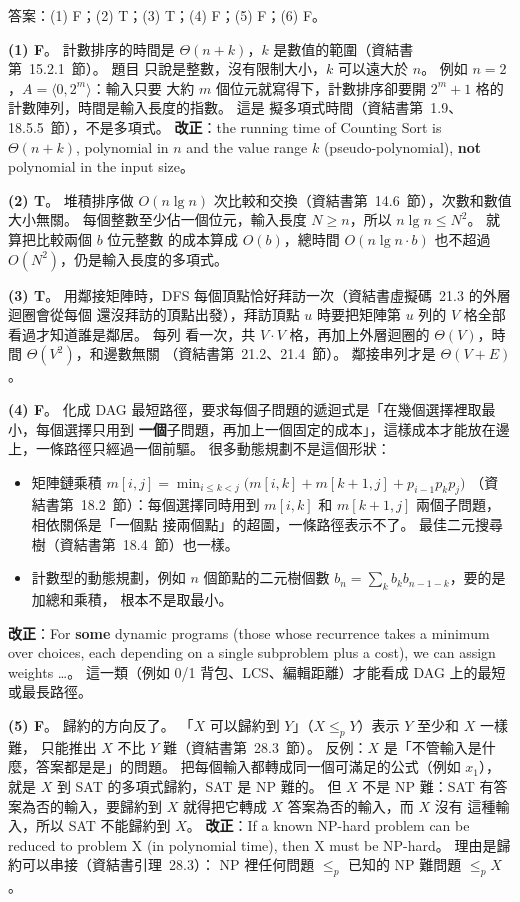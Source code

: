 \begin{pastsoln}
答案：(1) F；(2) T；(3) T；(4) F；(5) F；(6) F。

\textbf{(1) F}。 計數排序的時間是 $\Theta(n + k)$，$k$ 是數值的範圍（資結書第~15.2.1~節）。 題目
只說是整數，沒有限制大小，$k$ 可以遠大於 $n$。 例如 $n = 2$，$A = \langle 0, 2^m \rangle$：輸入只要
大約 $m$ 個位元就寫得下，計數排序卻要開 $2^m + 1$ 格的計數陣列，時間是輸入長度的指數。 這是
擬多項式時間（資結書第~1.9、18.5.5~節），不是多項式。 \textbf{改正}：the running time of Counting
Sort is $\Theta(n + k)$, polynomial in $n$ and the value range $k$ (pseudo-polynomial), \textbf{not}
polynomial in the input size。

\textbf{(2) T}。 堆積排序做 $O(n \lg n)$ 次比較和交換（資結書第~14.6~節），次數和數值大小無關。
每個整數至少佔一個位元，輸入長度 $N \ge n$，所以 $n \lg n \le N^2$。 就算把比較兩個 $b$ 位元整數
的成本算成 $O(b)$，總時間 $O(n \lg n \cdot b)$ 也不超過 $O(N^2)$，仍是輸入長度的多項式。

\textbf{(3) T}。 用鄰接矩陣時，DFS 每個頂點恰好拜訪一次（資結書虛擬碼~21.3 的外層迴圈會從每個
還沒拜訪的頂點出發），拜訪頂點 $u$ 時要把矩陣第 $u$ 列的 $V$ 格全部看過才知道誰是鄰居。 每列
看一次，共 $V \cdot V$ 格，再加上外層迴圈的 $\Theta(V)$，時間 $\Theta(V^2)$，和邊數無關
（資結書第~21.2、21.4~節）。 鄰接串列才是 $\Theta(V + E)$。

\textbf{(4) F}。 化成 DAG 最短路徑，要求每個子問題的遞迴式是「在幾個選擇裡取最小，每個選擇只用到
\textbf{一個}子問題，再加上一個固定的成本」，這樣成本才能放在邊上，一條路徑只經過一個前驅。
很多動態規劃不是這個形狀：
\begin{itemize}
\item 矩陣鏈乘積 $m[i, j] = \min_{i \le k < j} \bigl(m[i, k] + m[k+1, j] + p_{i-1} p_k p_j\bigr)$
（資結書第~18.2~節）：每個選擇同時用到 $m[i, k]$ 和 $m[k+1, j]$ 兩個子問題，相依關係是「一個點
接兩個點」的超圖，一條路徑表示不了。 最佳二元搜尋樹（資結書第~18.4~節）也一樣。
\item 計數型的動態規劃，例如 $n$ 個節點的二元樹個數 $b_n = \sum_k b_k b_{n-1-k}$，要的是加總和乘積，
根本不是取最小。
\end{itemize}
\textbf{改正}：For \textbf{some} dynamic programs (those whose recurrence takes a minimum over choices,
each depending on a single subproblem plus a cost), we can assign weights \ldots。 這一類（例如 0/1
背包、LCS、編輯距離）才能看成 DAG 上的最短或最長路徑。

\textbf{(5) F}。 歸約的方向反了。 「$X$ 可以歸約到 $Y$」（$X \le_p Y$）表示 $Y$ 至少和 $X$ 一樣難，
只能推出 $X$ 不比 $Y$ 難（資結書第~28.3~節）。 反例：$X$ 是「不管輸入是什麼，答案都是是」的問題。
把每個輸入都轉成同一個可滿足的公式（例如 $x_1$），就是 $X$ 到 SAT 的多項式歸約，SAT 是 NP 難的。
但 $X$ 不是 NP 難：SAT 有答案為否的輸入，要歸約到 $X$ 就得把它轉成 $X$ 答案為否的輸入，而 $X$ 沒有
這種輸入，所以 SAT 不能歸約到 $X$。 \textbf{改正}：If a known NP-hard problem can be reduced to
problem X (in polynomial time), then X must be NP-hard。 理由是歸約可以串接（資結書引理~28.3）：
NP 裡任何問題 $\le_p$ 已知的 NP 難問題 $\le_p X$。


\end{pastsoln}
